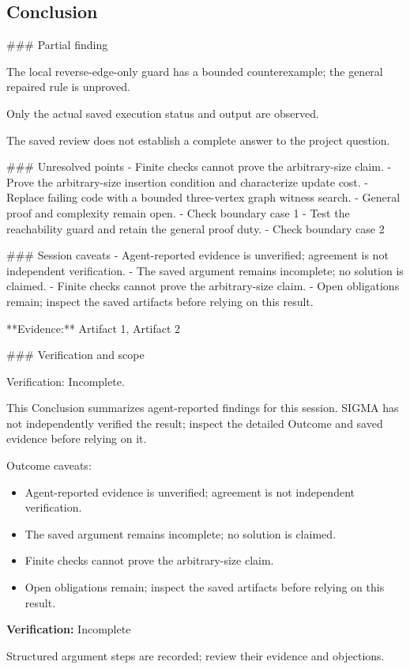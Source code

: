 \documentclass[11pt]{article}
\begin{document}
\subsection{Conclusion}
\#\#\# Partial finding

The local reverse-edge-only guard has a bounded counterexample; the general repaired rule is unproved.

Only the actual saved execution status and output are observed.

The saved review does not establish a complete answer to the project question.

\#\#\# Unresolved points
- Finite checks cannot prove the arbitrary-size claim.
- Prove the arbitrary-size insertion condition and characterize update cost.
- Replace failing code with a bounded three-vertex graph witness search.
- General proof and complexity remain open.
- Check boundary case 1
- Test the reachability guard and retain the general proof duty.
- Check boundary case 2

\#\#\# Session caveats
- Agent-reported evidence is unverified; agreement is not independent verification.
- The saved argument remains incomplete; no solution is claimed.
- Finite checks cannot prove the arbitrary-size claim.
- Open obligations remain; inspect the saved artifacts before relying on this result.

**Evidence:** Artifact 1, Artifact 2

\#\#\# Verification and scope

Verification: Incomplete.

This Conclusion summarizes agent-reported findings for this session. SIGMA has not independently verified the result; inspect the detailed Outcome and saved evidence before relying on it.\par
Outcome caveats:\par
\begin{itemize}
\item Agent-reported evidence is unverified; agreement is not independent verification.
\item The saved argument remains incomplete; no solution is claimed.
\item Finite checks cannot prove the arbitrary-size claim.
\item Open obligations remain; inspect the saved artifacts before relying on this result.
\end{itemize}
\textbf{Verification:} Incomplete\par
Structured argument steps are recorded; review their evidence and objections.\par
\end{document}
